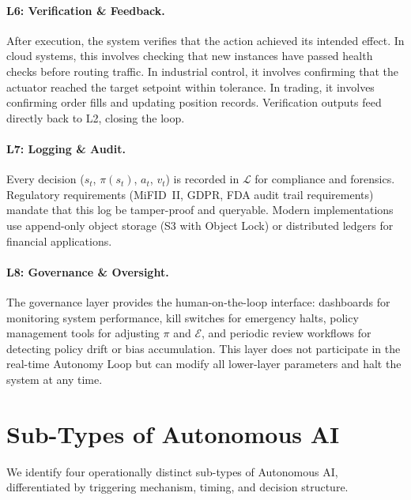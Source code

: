 \documentclass[12pt, a4paper]{article}
\begin{document}
\paragraph{L6: Verification \& Feedback.}
After execution, the system verifies that the action achieved its intended effect. In cloud systems, this involves checking that new instances have passed health checks before routing traffic. In industrial control, it involves confirming that the actuator reached the target setpoint within tolerance. In trading, it involves confirming order fills and updating position records. Verification outputs feed directly back to L2, closing the loop.

\paragraph{L7: Logging \& Audit.}
Every decision ($s_t$, $\pi(s_t)$, $a_t$, $v_t$) is recorded in $\mathcal{L}$ for compliance and forensics. Regulatory requirements (MiFID~II, GDPR, FDA audit trail requirements) mandate that this log be tamper-proof and queryable. Modern implementations use append-only object storage (S3 with Object Lock) or distributed ledgers for financial applications.

\paragraph{L8: Governance \& Oversight.}
The governance layer provides the human-on-the-loop interface: dashboards for monitoring system performance, kill switches for emergency halts, policy management tools for adjusting $\pi$ and $\mathcal{E}$, and periodic review workflows for detecting policy drift or bias accumulation. This layer does not participate in the real-time Autonomy Loop but can modify all lower-layer parameters and halt the system at any time.

\section{Sub-Types of Autonomous AI}\label{sec:subtypes}

We identify four operationally distinct sub-types of Autonomous AI, differentiated by triggering mechanism, timing, and decision structure.
\end{document}
